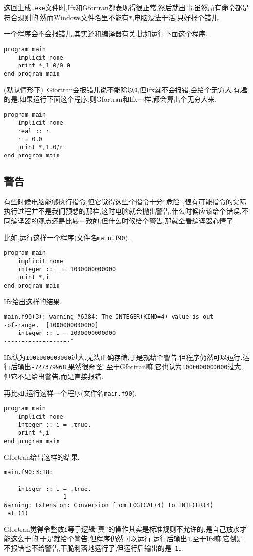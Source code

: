 这回生成\texttt{.exe}文件时,Ifx和Gfortran都表现得很正常,然后就出事.虽然所有命令都是符合规则的,然而Windows文件名里不能有\texttt{*},电脑没法干活,只好报个错儿.

一个程序会不会报错儿,其实还和编译器有关.比如运行下面这个程序.
\begin{lstlisting}
program main
    implicit none
    print *,1.0/0.0
end program main
\end{lstlisting}
(默认情形下)~Gfortran会报错儿说不能除以0,但Ifx就不会报错,会给个无穷大.有趣的是,如果运行下面这个程序,则Gfortran和Ifx一样,都会算出个无穷大来.
\begin{lstlisting}
program main
    implicit none
    real :: r
    r = 0.0
    print *,1.0/r
end program main
\end{lstlisting}

\subsection{警告}\label{fortran_warning}

有些时候电脑能够执行指令,但它觉得这些个指令十分``危险'',很有可能指令的实际执行过程并不是我们预想的那样,这时电脑就会抛出警告.什么时候应该给个错误,不同编译器的观点还是比较一致的,但什么时候给个警告,那就全看编译器心情了.

比如,运行这样一个程序(文件名\texttt{main.f90}).
\begin{lstlisting}
program main
    implicit none
    integer :: i = 1000000000000
    print *,i
end program main
\end{lstlisting}

Ifx给出这样的结果.
\begin{lstlisting}
main.f90(3): warning #6384: The INTEGER(KIND=4) value is out
-of-range.  [1000000000000]
    integer :: i = 1000000000000
-------------------^
\end{lstlisting}

Ifx认为\texttt{1000000000000}过大,无法正确存储,于是就给个警告,但程序仍然可以运行.运行后输出\texttt{-727379968},果然很奇怪! 至于Gfortran嘛,它也认为\texttt{1000000000000}过大,但它不是给出警告,而是直接报错.

再比如,运行这样一个程序(文件名\texttt{main.f90}).
\begin{lstlisting}
program main
    implicit none
    integer :: i = .true.
    print *,i
end program main
\end{lstlisting}

Gfortran给出这样的结果.
\begin{lstlisting}
main.f90:3:18:

    integer :: i = .true.
                 1
Warning: Extension: Conversion from LOGICAL(4) to INTEGER(4)
 at (1)
\end{lstlisting}

Gfortran觉得令整数\texttt{i}等于逻辑``真''的操作其实是标准规则不允许的,是自己放水才能这么干的,于是就给个警告,但程序仍然可以运行.运行后输出\texttt{1}.至于Ifx嘛,它倒是不报错也不给警告,干脆利落地运行了,但运行后输出的是\texttt{-1}\dots
